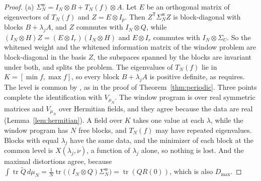 \documentclass[11pt,onecolumn]{IEEEtran}
\newcommand{\tr}{\operatorname{tr}}
\newcommand{\tQ}{\tilde Q}
\begin{document}
\begin{proof}
(a) $\Sigma^{\mathrm w}_N=I_N\otimes B+T_N(f)\otimes A$. Let $E$ be an
orthogonal matrix of eigenvectors of $T_N(f)$ and $Z=E\otimes I_p$. Then
$Z^{\mathsf T}\Sigma^{\mathrm w}_NZ$ is block-diagonal with blocks
$B+\lambda_jA$, and $Z$ commutes with $I_N\otimes Q$, while
$(I_N\otimes H)Z=(E\otimes I_r)(I_N\otimes H)$ and $E\otimes I_r$ commutes
with $I_N\otimes\Sigma_U$. So the whitened weight and the whitened
information matrix of the window problem are block-diagonal in the
basis $Z$, the subspaces spanned by the blocks are invariant under
both, and \cite[Theorem~12]{part1} splits the problem. The eigenvalues
of $T_N(f)$ lie in $K=[\min f,\max f]$, so every block $B+\lambda_jA$ is
positive definite, as \cite{part1} requires. The level is
common by \cite[Theorem~7]{part1}, as in the proof of
Theorem~\ref{thm:periodic}. Three points complete the identification
with $V_{\mu_N}$. The window program is over real symmetric matrices
and $V_{\mu_N}$ over Hermitian fields, and they agree because the data
are real (Lemma~\ref{lem:hermitian}). A field over $K$ takes one value
at each $\lambda$, while the window program has $N$ free blocks, and
$T_N(f)$ may have repeated eigenvalues. Blocks with equal $\lambda_j$
have the same data, and the minimizer of each block at the common
level is $X(\lambda_j,\nu)$, a function of $\lambda_j$ alone, so nothing
is lost. And the maximal distortions agree, because
$\int\tr\tQ\,d\mu_N=\tfrac1N\tr\bigl((I_N\otimes Q)\Sigma^{\mathrm w}_N\bigr)=\tr(QR(0))$,
which is also $D_{\max}$.


\end{proof}
\end{document}

